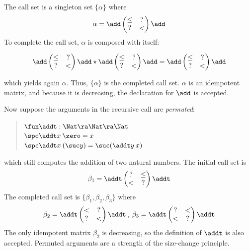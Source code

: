\noindent The call set is a singleton set $\{ \alpha \}$ where
\[
\alpha = 
\add\begin{pmatrix}
\leq & ? \\
?    & < \\
\end{pmatrix}\add
\]
\noindent To complete the call set, $\alpha$ is composed with itself:

\[
\add\begin{pmatrix}
\leq & ? \\
?    & < \\
\end{pmatrix}\add
\star
\add\begin{pmatrix}
\leq & ? \\
?    & < \\
\end{pmatrix}\add
=
\add\begin{pmatrix}
\leq & ? \\
?    & < \\
\end{pmatrix}\add
\]

\noindent which yields again $\alpha$. 
Thus, $\{ \alpha \}$ is the completed call set.
$\alpha$ is an idempotent matrix, and because it is decreasing, the declaration for $\add$ is accepted.

\noindent Now suppose the arguments in the recursive call are \emph{permuted}:
\begin{quote}
$\fun \addt : \Nat \ra \Nat \ra \Nat$\\
$\spc \addt x \: \zero = x $\\
$\spc \addt x \: (\suc y) = \suc (\addt y \: x)  $
\end{quote}
which still computes the addition of two natural numbers.
\noindent The initial call set is  
\[
\beta_1 = \addt\begin{pmatrix}
? & \leq \\
< & ?   \\
\end{pmatrix}\addt
\]
The completed call set is $\{\beta_1,\beta_2,\beta_3\}$ where 
\[
\beta_2 = \addt \begin{pmatrix}
< & ?    \\
? & <    \\
\end{pmatrix} \addt
\:,\:
\beta_3 = \addt \begin{pmatrix}
? & <    \\
< & ?    \\
\end{pmatrix} \addt
\] 
The only idempotent matrix $\beta_2$ is decreasing, so the definition of $\addt$ is also accepted.
Permuted arguments are a strength of the size-change principle.

